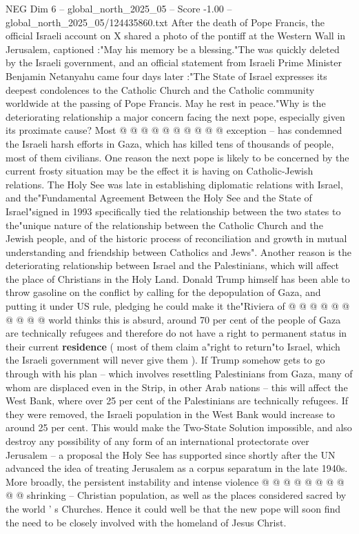 \begin{textsample}{NEG Dim 6 – global\_north\_2025\_05 – Score -1.00 – global\_north\_2025\_05/124435860.txt}
After the death of Pope Francis, the official Israeli account on X shared a photo of the pontiff at the Western Wall in Jerusalem, captioned :"May his memory be a blessing."The was quickly deleted by the Israeli government, and an official statement from Israeli Prime Minister Benjamin Netanyahu came four days later :"The State of Israel expresses its deepest condolences to the Catholic Church and the Catholic community worldwide at the passing of Pope Francis.
May he rest in peace."Why is the deteriorating relationship a major concern facing the next pope, especially given its proximate cause?
Most @ @ @ @ @ @ @ @ @ @ exception -- has condemned the Israeli harsh efforts in Gaza, which has killed tens of thousands of people, most of them civilians.
One reason the next pope is likely to be concerned by the current frosty situation may be the effect it is having on Catholic-Jewish relations.
The Holy See was late in establishing diplomatic relations with Israel, and the"Fundamental Agreement Between the Holy See and the State of Israel"signed in 1993 specifically tied the relationship between the two states to the"unique nature of the relationship between the Catholic Church and the Jewish people, and of the historic process of reconciliation and growth in mutual understanding and friendship between Catholics and Jews".
Another reason is the deteriorating relationship between Israel and the Palestinians, which will affect the place of Christians in the Holy Land.
Donald Trump himself has been able to throw gasoline on the conflict by calling for the depopulation of Gaza, and putting it under US rule, pledging he could make it the"Riviera of @ @ @ @ @ @ @ @ @ @ world thinks this is absurd, around 70 per cent of the people of Gaza are technically refugees and therefore do not have a right to permanent status in their current \textbf{residence} ( most of them claim a"right to return"to Israel, which the Israeli government will never give them ).
If Trump somehow gets to go through with his plan -- which involves resettling Palestinians from Gaza, many of whom are displaced even in the Strip, in other Arab nations -- this will affect the West Bank, where over 25 per cent of the Palestinians are technically refugees.
If they were removed, the Israeli population in the West Bank would increase to around 25 per cent.
This would make the Two-State Solution impossible, and also destroy any possibility of any form of an international protectorate over Jerusalem -- a proposal the Holy See has supported since shortly after the UN advanced the idea of treating Jerusalem as a corpus separatum in the late 1940s.
More broadly, the persistent instability and intense violence @ @ @ @ @ @ @ @ @ @ shrinking -- Christian population, as well as the places considered sacred by the world ' s Churches.
Hence it could well be that the new pope will soon find the need to be closely involved with the homeland of Jesus Christ.

\end{textsample}
